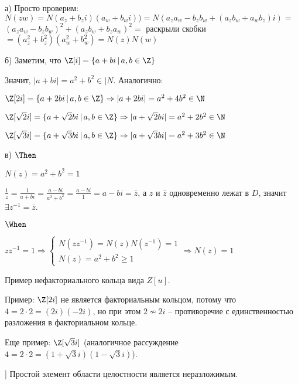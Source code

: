 \begin{solution}

а) Просто проверим: \(N(zw)= N(a_z + b_zi)(a_w + b_wi)) = N(a_za_w - b_zb_w + (a_zb_w + a_wb_z)i)=\)
\((a_za_w-b_zb_w)^2 + (a_zb_w + b_za_w)^2 =\)
раскрыли скобки
\(= (a_z^2 + b_z^2)(a_w^2 + b_w^2) = N(z)N(w)\)

б) Заметим, что \(\Z[i] = \{a + bi\,|\,a,b \in \Z\}\)

Значит, \(|a + bi| = a^2 + b^2 \in |N\). Аналогично:

\(\Z[2i] = \{a + 2bi\,|\,a,b \in \Z\} \Rightarrow |a + 2bi| = a^2 + 4b^2 \in \N\)

\(\Z[\sqrt{2}i] = \{a + \sqrt{2}bi\,|\,a,b \in \Z\} \Rightarrow |a + \sqrt{2}bi| = a^2 + 2b^2 \in \N\)

\(\Z[\sqrt{3}i] = \{a + \sqrt{3}bi\,|\,a,b \in \Z\} \Rightarrow |a + \sqrt{3}bi| = a^2 + 3b^2 \in \N\)

в) \(\Then\)

\(N(z) = a^2 + b^2 = 1\)

\(\frac{1}{z} = \frac{1}{a+bi} = \frac{a-bi}{a^2 + b^2} = \frac{a-bi}{1} = a-bi = \bar{z}\),
а \(z\) и \(\bar{z}\) одновременно лежат в \(D\), значит \(\exists z^{-1} = \bar{z}\).

\(\When\)

\(zz^{-1} = 1 \Rightarrow \begin{cases} N(zz^{-1}) = N(z)N(z^{-1}) = 1 \\ N(z) = a^2 + b^2 \geqslant 1  \end{cases} \Rightarrow N(z) = 1\)

\end{solution}

\begin{problem}[3]
Пример нефакториального кольца вида $Z[u]$.
\end{problem}

\begin{solution}
Пример: \(\Z[2i]\) не является факториальным кольцом, потому что \(4 = 2\cdot2 = (2i)(-2i)\),
но при этом \(2 \nsim 2i\) -- противоречие с единственностью разложения в факториальном кольце.

Еще пример: \(\Z[\sqrt{3}i]\) (аналогичное рассуждение \(4 = 2\cdot 2 = (1+\sqrt{3}i)(1-\sqrt{3}i)\)).
\end{solution}

\begin{problem}[4 (2.7) [Каргальцев]]
Простой элемент области целостности является неразложимым.
\end{problem}

